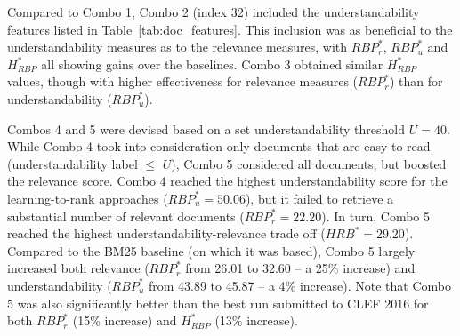 Compared to Combo 1, Combo 2 (index 32) included the understandability features listed in Table~\ref{tab:doc_features}. This inclusion was as beneficial to the understandability measures as to the relevance measures, with $RBP_r^*$, $RBP_u^*$ and $H_{RBP}^*$ all showing gains over the baselines. Combo 3 obtained similar $H_{RBP}^*$ values, though with higher effectiveness for relevance measures ($RBP_r^*$) than for understandability ($RBP_u^*$).

Combos 4 and 5 were devised based on a set understandability threshold $U=40$. While Combo 4 took into consideration only documents that are easy-to-read (understandability label $\le$ $U$), Combo 5 considered all documents, but boosted the relevance score. Combo 4 reached the highest understandability score for the learning-to-rank approaches ($RBP_u^{*}=50.06$), but it failed to retrieve a substantial number of relevant documents ($RBP_r^{*}=22.20$). In turn, Combo 5 reached the highest understandability-relevance trade off ($HRB^{*}=29.20$). Compared to the BM25 baseline (on which it was based), Combo 5  largely increased both relevance ($RBP_r^*$ from 26.01 to 32.60 -- a 25\% increase) and understandability ($RBP_u^*$ from 43.89 to 45.87 -- a 4\% increase). Note that Combo 5 was also significantly better than the best run submitted to CLEF 2016 for both $RBP_r^{*}$ (15\% increase) and $H_{RBP}^{*}$ (13\% increase).


